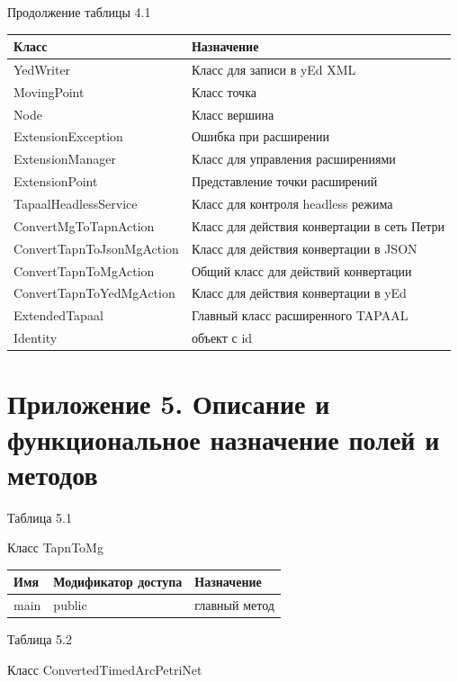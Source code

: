 \documentclass{../TechDoc}
\begin{document}
	\begin{flushright}
		Продолжение таблицы 4.1
	\end{flushright}
	\begin{tabular}{|l|m{20em}|}
		\hline
		\textbf{Класс} & \textbf{Назначение} \\
		\hline
		YedWriter & Класс для записи в yEd XML\\
		\hline
		MovingPoint & Класс точка \\
		\hline
		Node & Класс вершина\\
		\hline
		ExtensionException & Ошибка при расширении\\
		\hline
		ExtensionManager & Класс для управления расширениями \\
		\hline
		ExtensionPoint & Представление точки расширений \\
		\hline
		TapaalHeadlessService & Класс для контроля headless режима\\
		\hline
		ConvertMgToTapnAction & Класс для действия конвертации в сеть Петри\\
		\hline
		ConvertTapnToJsonMgAction & Класс для действия конвертации в JSON\\
		\hline
		ConvertTapnToMgAction &  Общий класс для действий конвертации\\
		\hline
		ConvertTapnToYedMgAction & Класс для действия конвертации в yEd \\
		\hline
		ExtendedTapaal & Главный класс расширенного TAPAAL \\
		\hline
		Identity & объект с id \\
		\hline
	\end{tabular}
	
	\section*{Приложение 5. Описание и функциональное назначение полей и методов}
	\begin{flushright}
		Таблица 5.1
	\end{flushright}
	Класс TapnToMg
	
	\begin{tabular}{|p{5cm}|p{5cm}|p{5cm}|}
		\hline
		\textbf{Имя} & \textbf{Модификатор доступа} & \textbf{Назначение} \\
		\hline
		main & public & главный метод \\
		\hline
	\end{tabular}
	\begin{flushright}
		Таблица 5.2
	\end{flushright}
	Класс ConvertedTimedArcPetriNet
	
\end{document}
